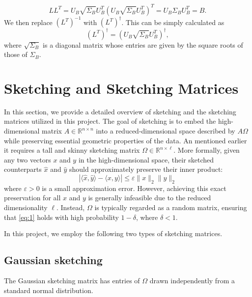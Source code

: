 \documentclass[a4paper, 12pt,oneside]{article}
\begin{document}
	\[
	LL^T = U_B \sqrt{\Sigma_B} U_B^T (U_B \sqrt{\Sigma_B} U_B^T)^T = U_B \Sigma_B U_B^T = B.
	\]
	We then replace $(L^T)^{-1}$ with $(L^T)^\dagger$. This can be simply calculated as
	\[
	(L^T)^\dagger = (U_B \sqrt{\Sigma_B} U_B^T)^\dagger,
	\]
	where $\sqrt{\Sigma_B}$ is a diagonal matrix whose entries are given by the square roots of those of $\Sigma_B$.
	\section{Sketching and Sketching Matrices}

	In this section, we provide a detailed overview of sketching and the sketching matrices utilized in this project. The goal of sketching is to embed the high-dimensional matrix $A \in \mathbb{R}^{n \times n}$ into a reduced-dimensional space described by $A\Omega$ while preserving essential geometric properties of the data. An mentioned earlier it requires a tall and skinny sketching matrix $\Omega \in \mathbb{R}^{n \times \ell}$. 
	More formally, given any two vectors $x$ and $y$ in the high-dimensional space, their sketched counterparts $\hat{x}$ and $\hat{y}$ should approximately preserve their inner product:
	\begin{equation}\label{eq:1}
	\left| \langle \hat{x}, \hat{y} \rangle - \langle x, y \rangle \right| \leq \varepsilon \|x\|_2 \|y\|_2 \tag{2}
	\end{equation}
	where $\varepsilon > 0$ is a small approximation error. However, achieving this exact preservation for all $x$ and $y$ is generally infeasible due to the reduced dimensionality $\ell$. Instead, $\Omega$ is typically regarded as a random matrix, ensuring that \cref{eq:1} holds with high probability $1 - \delta$, where $\delta < 1$.

	In this project, we employ the following two types of sketching matrices.
	\subsection{Gaussian sketching }
	The Gaussian sketching matrix has entries of $\Omega$ drawn independently from a standard normal distribution.
\end{document}
